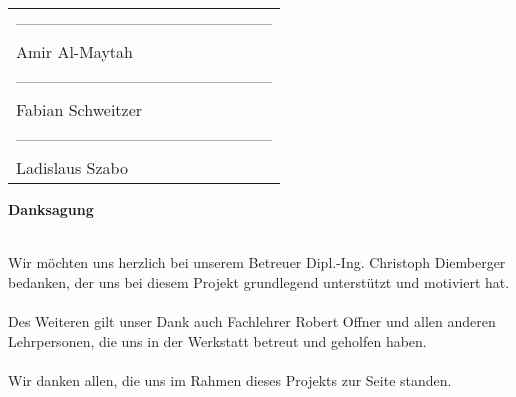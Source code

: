 \documentclass[titlepage,12pt,twoside]{article}
\begin{document}
\begin{tabular}{p{7cm}}
\\
\vspace{3cm}
------------------------------------------------\\
Amir Al-Maytah\\
\vspace{3cm}
------------------------------------------------\\
Fabian Schweitzer\\
\vspace{3cm}
------------------------------------------------\\
Ladislaus Szabo\\


\end{tabular}

\newpage
\thispagestyle{empty}
\clearpage\mbox{}\clearpage


\thispagestyle{empty}

\begin{center}
\Large{\textbf{Danksagung}} 
\end{center}

\hspace{2cm}
\\
Wir möchten uns herzlich bei unserem Betreuer Dipl.-Ing. Christoph Diemberger bedanken, 
der uns bei diesem Projekt grundlegend unterstützt und motiviert hat. \\
\\
Des Weiteren gilt unser Dank auch Fachlehrer Robert Offner und allen anderen Lehrpersonen, 
die uns in der Werkstatt betreut und geholfen haben. \\
\\
Wir danken allen, die uns im Rahmen dieses Projekts zur Seite standen.      

\newpage
\thispagestyle{empty}
\clearpage\mbox{}\clearpage


\thispagestyle{empty}
	
\end{document}
